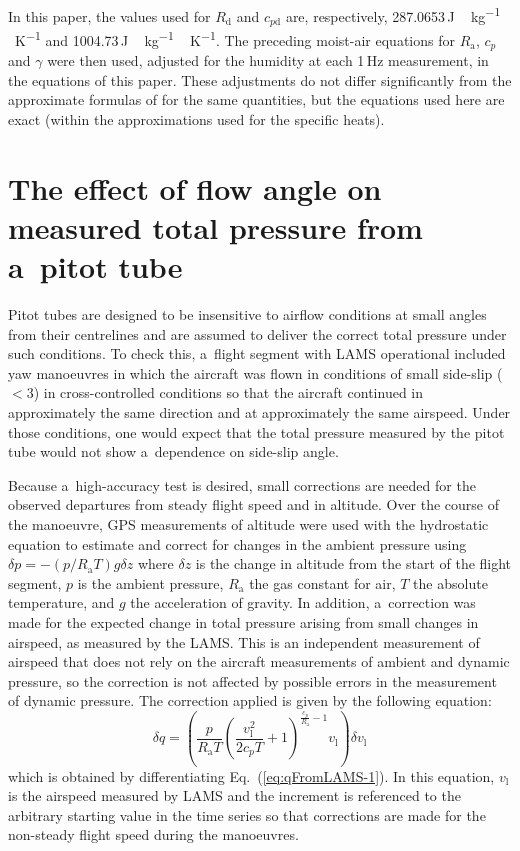 \documentclass[amtd, online, hvmath]{copernicus}
\begin{document}
In this paper, the values used for $R_{\mathrm{d}}$ and $c_{p\mathrm{d}}$ are,
respectively, 287.0653\,\unit{J\,kg^{-1}\,K^{-1}} and
1004.73\,\unit{J\,kg^{-1}\,K^{-1}}.  The preceding moist-air
equations for $R_{\mathrm{a}}$, $c_p$ and $\gamma$ were then used,
adjusted for the humidity at each 1\,Hz measurement, in the equations
of this paper. These adjustments do not differ significantly from the
approximate formulas of \citet{KhelifEtAl1999} for the same
quantities, but the equations used here are exact (within the
approximations used for the specific heats).

\section{The effect of flow angle on measured total pressure from a~pitot
tube}

Pitot tubes are designed to be insensitive to airflow conditions at
small angles from their centrelines and are assumed to deliver the
correct total pressure under such conditions. To check this, a~flight
segment with LAMS operational included yaw manoeuvres in which the
aircraft was flown in conditions of small side-slip
($<3${\degree}) in cross-controlled conditions so that the
aircraft continued in approximately the same direction and at
approximately the same airspeed. Under those conditions, one would
expect that the total pressure measured by the pitot tube would not
show a~dependence on side-slip angle.

Because a~high-accuracy test is desired, small corrections are needed
for the observed departures from steady flight speed and in altitude.
Over the course of the manoeuvre, GPS measurements of altitude were
used with the hydrostatic equation to estimate and correct for changes
in the ambient pressure using $\delta p=-(p/R_{\mathrm{a}}T)g\delta z$
where $\delta z$ is the change in altitude from the start of the
flight segment, $p$ is the ambient pressure, $R_{\mathrm{a}}$ the gas
constant for air, $T$ the absolute temperature, and $g$ the
acceleration of gravity.  In addition, a~correction was made for the
expected change in total pressure arising from small changes in
airspeed, as measured by the LAMS. This is an independent
measurement of airspeed that does not rely on the aircraft
measurements of ambient and dynamic pressure, so the correction is not
affected by possible errors in the measurement of dynamic
pressure. The correction applied is given by the following equation:
\begin{equation}
\delta q=\left(\frac{p}{R_{\mathrm{a}}T}\left(\frac{v_{\mathrm{l}}^2}{2c_pT}+1\right)^{\frac{c_p}{R_{\mathrm{a}}}-1}v_{\mathrm{l}}\right)\delta v_{\mathrm{l}}\label{eq:CorrectionInSideslipFigure}
\end{equation}
which is obtained by differentiating Eq.~(\ref{eq:qFromLAMS-1}).  In
this equation, $v_{\mathrm{l}}$ is the airspeed measured by LAMS and
the increment is referenced to the arbitrary starting value in the
time series so that corrections are made for the non-steady flight
speed during the manoeuvres.
\end{document}
